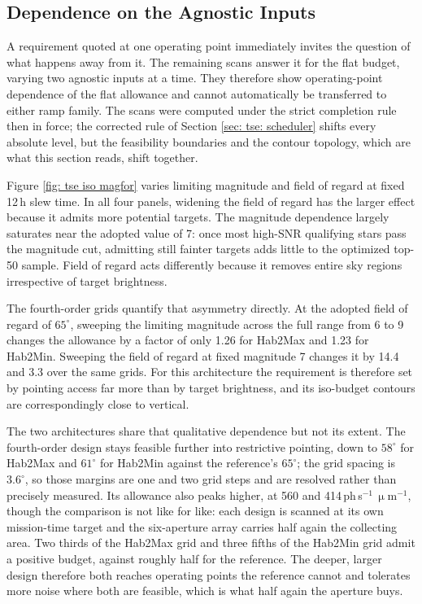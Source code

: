 \documentclass[12pt,a4paper]{article}
\numberwithin{equation}{section}
\numberwithin{figure}{section}
\numberwithin{table}{section}
\begin{document}
\subsection{Dependence on the Agnostic Inputs} \label{sec: tse: agnostic}
A requirement quoted at one operating point immediately invites the question of what happens away from it. The remaining scans answer it for the flat budget, varying two agnostic inputs at a time. They therefore show operating-point dependence of the flat allowance and cannot automatically be transferred to either ramp family. The scans were computed under the strict completion rule then in force; the corrected rule of Section \ref{sec: tse: scheduler} shifts every absolute level, but the feasibility boundaries and the contour topology, which are what this section reads, shift together.

Figure \ref{fig: tse iso magfor} varies limiting magnitude and field of regard at fixed 12\,h slew time. In all four panels, widening the field of regard has the larger effect because it admits more potential targets. The magnitude dependence largely saturates near the adopted value of 7: once most high-SNR qualifying stars pass the magnitude cut, admitting still fainter targets adds little to the optimized top-50 sample. Field of regard acts differently because it removes entire sky regions irrespective of target brightness.

The fourth-order grids quantify that asymmetry directly. At the adopted field of regard of $65^\circ$, sweeping the limiting magnitude across the full range from 6 to 9 changes the allowance by a factor of only 1.26 for Hab2Max and 1.23 for Hab2Min. Sweeping the field of regard at fixed magnitude 7 changes it by 14.4 and 3.3 over the same grids. For this architecture the requirement is therefore set by pointing access far more than by target brightness, and its iso-budget contours are correspondingly close to vertical.

The two architectures share that qualitative dependence but not its extent. The fourth-order design stays feasible further into restrictive pointing, down to $58^\circ$ for Hab2Max and $61^\circ$ for Hab2Min against the reference's $65^\circ$; the grid spacing is $3.6^\circ$, so those margins are one and two grid steps and are resolved rather than precisely measured. Its allowance also peaks higher, at 560 and 414\,ph\,s$^{-1}\,\upmu$m$^{-1}$, though the comparison is not like for like: each design is scanned at its own mission-time target and the six-aperture array carries half again the collecting area. Two thirds of the Hab2Max grid and three fifths of the Hab2Min grid admit a positive budget, against roughly half for the reference. The deeper, larger design therefore both reaches operating points the reference cannot and tolerates more noise where both are feasible, which is what half again the aperture buys.
\end{document}
